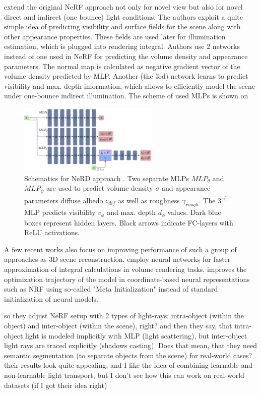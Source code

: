 \documentclass[english]{article}
\newcommand{\rphr}[1]{{\color{blue}#1}}
\begin{document}
\cite{srinivasan2020nerv} extend the original NeRF approach not only for novel view but also for novel direct and indirect (one bounce) light conditions. The authors exploit a quite simple idea of predicting visibility and surface fields for the scene along with other appearance properties. These fields are used later for illumination estimation, which is plugged into rendering integral. Authors use 2 networks instead of one used in NeRF for predicting the volume density and appearance parameters. The normal map is calculated as negative gradient vector of the volume density predicted by MLP. Another (the 3rd) network learns to predict visibility and max. depth information, which allows to efficiently model the scene under one-bounce indirect illumination. The scheme of used MLPs is shown on 

\begin{figure}[t]
    \centering
    \includegraphics[width=0.6\textwidth]{img/mlp_nerv.png}
    \caption{Schematics for NeRD approach \cite{srinivasan2020nerv}. Two separate MLPs $MLP_\theta$ and $MLP_\psi$ are used to predict volume density $\sigma$ and appearance parameters diffuse albedo $c_{dif}$ as well as roughness $\gamma_{rough}$. The 3\textsuperscript{rd} MLP predicts visibility $v_\phi$ and max. depth $d_\phi$ values. Dark blue boxes represent hidden layers. Black arrows indicate FC-layers with ReLU activations.}
    \label{fig:mlp_nerv}
\end{figure}

A few recent works also focus on improving performance of such a group of approaches as 3D scene reconstruction. \cite{lindell2020autoint} employ neural networks for faster approximation of integral calculations in volume rendering tasks. \cite{tancik2020meta} improves the optimization trajectory of the model in coordinate-based neural representations such as NRF using so-called "Meta Initialization" instead of standard initialization of neural models.

\rphr{\cite{guo2020osf} so they adjust NeRF setup with 2 types of light-rays: intra-object (within the object) and inter-object (within the scene), right? and then they say, that intra-object light is modeled implicitly with MLP (light scattering), but inter-object light rays are traced explicitly (shadows casting). Does that mean, that they need semantic segmentation (to separate objects from the scene) for real-world cases? their results look quite appealing, and I like the idea of combining learnable and non-learnable light transport, but I don't see how this can work on real-world datasets (if I got their idea right)}
\end{document}
